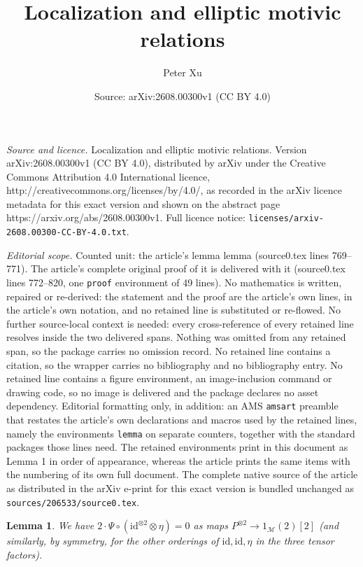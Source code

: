\documentclass[10pt,a4paper]{amsart}
\title{Localization and elliptic motivic relations}
\author{Peter Xu}
\date{Source: arXiv:2608.00300v1 (CC BY 4.0)}
\newtheorem{lemma}{Lemma}
\begin{document}
\maketitle

\noindent\emph{Source and licence.} Localization and elliptic motivic relations. Version arXiv:2608.00300v1 (CC BY 4.0), distributed by arXiv under the Creative Commons Attribution 4.0 International licence, http://creativecommons.org/licenses/by/4.0/, as recorded in the arXiv licence metadata for this exact version and shown on the abstract page https://arxiv.org/abs/2608.00300v1. Full licence notice: \texttt{licenses/arxiv-2608.00300-CC-BY-4.0.txt}.\par\smallskip

\noindent\textit{Editorial scope.} Counted unit: the article's lemma lemma (source0.tex lines 769--771). The article's complete original proof of it is delivered with it (source0.tex lines 772--820, one \texttt{proof} environment of 49 lines). No mathematics is written, repaired or re-derived: the statement and the proof are the article's own lines, in the article's own notation, and no retained line is substituted or re-flowed.  No further source-local context is needed: every cross-reference of every retained line resolves inside the two delivered spans.  Nothing was omitted from any retained span, so the package carries no omission record.  No retained line contains a citation, so the wrapper carries no bibliography and no bibliography entry.  No retained line contains a figure environment, an image-inclusion command or drawing code, so no image is delivered and the package declares no asset dependency.  Editorial formatting only, in addition: an AMS \texttt{amsart} preamble that restates the article's own declarations and macros used by the retained lines, namely the environments \texttt{lemma} on separate counters, together with the standard packages those lines need.  The retained environments print in this document as Lemma 1 in order of appearance, whereas the article prints the same items with the numbering of its own full document.  The complete native source of the article as distributed in the arXiv e-print for this exact version is bundled unchanged as \texttt{sources/206533/source0.tex}.
\begin{lemma}
    We have $2 \cdot \Psi \circ (\mathrm{id}^{\otimes 2} \otimes \eta)=0$ as maps $P^{\otimes 2} \to 1_{\mathcal{M}}(2)[2]$ (and similarly, by symmetry, for the other orderings of $\mathrm{id},\mathrm{id},\eta$ in the three tensor factors).
\end{lemma}
\end{document}
